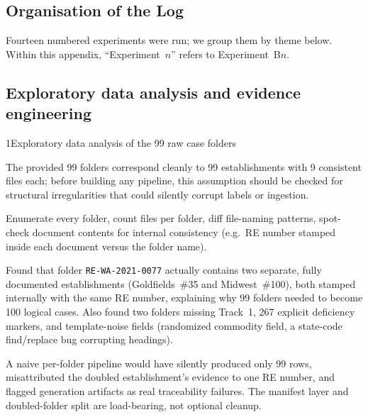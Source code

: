 \subsection{Organisation of the Log}

Fourteen numbered experiments were run; we group them by theme below. Within this appendix, ``Experiment~$n$'' refers to Experiment~B$n$.

\subsection{Exploratory data analysis and evidence engineering}
\label{sec:t2-eda}

\begin{explog}{1}{Exploratory data analysis of the 99 raw case folders}
\item[Hypothesis] The provided 99 folders correspond cleanly to 99 establishments with 9 consistent files each; before building any pipeline, this assumption should be checked for structural irregularities that could silently corrupt labels or ingestion.
\item[Method] Enumerate every folder, count files per folder, diff file-naming patterns, spot-check document contents for internal consistency (e.g.\ RE number stamped inside each document versus the folder name).
\item[Result] Found that folder \texttt{RE-WA-2021-0077} actually contains two separate, fully documented establishments (Goldfields~\#35 and Midwest~\#100), both stamped internally with the same RE number, explaining why 99 folders needed to become 100 logical cases. Also found two folders missing Track~1, 267 explicit deficiency markers, and template-noise fields (randomized commodity field, a state-code find/replace bug corrupting headings).
\item[Inference] A naive per-folder pipeline would have silently produced only 99 rows, misattributed the doubled establishment's evidence to one RE number, and flagged generation artifacts as real traceability failures. The manifest layer and doubled-folder split are load-bearing, not optional cleanup.
\end{explog}

